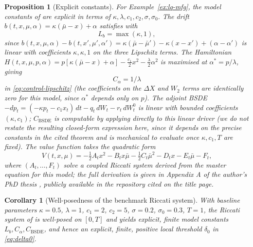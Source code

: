\documentclass[11pt]{article}
\newtheorem{proposition}[theorem]{Proposition}
\newtheorem{corollary}[theorem]{Corollary}
\theoremstyle{remark}
\begin{document}
\begin{proposition}[Explicit constants]
\label{prop:lq-value}
For Example~\ref{ex:lq-mfg}, the model constants of 
are explicit in terms of $\kappa,\lambda,c_1,c_2,\sigma,\sigma_0$. The drift
$b(t,x,\mu,\alpha) = \kappa(\bar\mu-x)+\alpha$ satisfies
 with
\begin{equation}
    L_b = \max(\kappa, 1),
    \label{eq:lq-Lb}
\end{equation}
since $b(t,x,\mu,\alpha)-b(t,x',\mu',\alpha') = \kappa(\bar\mu-\bar\mu')-\kappa(x-x')
+(\alpha-\alpha')$ is linear with coefficients $\kappa,\kappa,1$ on the three
Lipschitz terms. The Hamiltonian
$H(t,x,\mu,p,\alpha)=p[\kappa(\bar\mu-x)+\alpha]-\tfrac{c_1}{2}x^2-\tfrac{\lambda}{2}
\alpha^2$ is maximised at $\alpha^*=p/\lambda$, giving
\begin{equation}
    C_\alpha = 1/\lambda
    \label{eq:lq-Calpha}
\end{equation}
in \eqref{eq:control-lipschitz} (the coefficients on the $\Delta X$ and $W_2$ terms
are identically zero for this model, since $\alpha^*$ depends only on $p$). The
adjoint BSDE $-dp_t = (-\kappa p_t - c_1 x_t)\,dt - q_t\,dW_t - r_t\,dW_t^0$ is
linear with bounded coefficients $(\kappa,c_1)$; $C_{\mathrm{BSDE}}$ is computable
by applying \citet[Thm.~4.3.1]{zhang2017} directly to this linear driver (we do
not restate the resulting closed-form expression here, since it depends on the
precise constants in the cited theorem and is mechanical to evaluate once
$\kappa,c_1,T$ are fixed). The value function
takes the quadratic form
\[
    V(t,x,\mu) = -\tfrac12 A_t x^2 - B_t x\bar\mu - \tfrac12 C_t\bar\mu^2 - D_t x -
    E_t\bar\mu - F_t,
\]
where $(A_t,\ldots,F_t)$ solve a coupled Riccati system derived from the master
equation for this model; the full derivation is given in Appendix A of the
author's PhD thesis \citep{monyimba2026thesis}, publicly available in the
repository cited on the title page.
\end{proposition}

\begin{corollary}[Well-posedness of the benchmark Riccati system]
\label{cor:lq-riccati}
With baseline parameters $\kappa=0.5$, $\lambda=1$, $c_1=2$, $c_2=5$, $\sigma=0.2$,
$\sigma_0=0.3$, $T=1$, the Riccati system of  is well-posed on
$[0,T]$ and yields explicit, finite model constants $L_b, C_\alpha,
C_{\mathrm{BSDE}}$, and hence an explicit, finite, positive local threshold
$\delta_0$ in \eqref{eq:delta0}.
\end{corollary}
\end{document}
